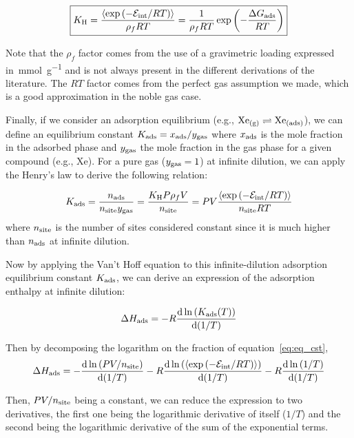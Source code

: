 \documentclass[main.tex]{subfiles}
\begin{document}
\begin{equation}\label{eq:henry}
    \boxed{
    K_{\text{H}} = \dfrac{\langle \exp\left(-\mathcal{E}_{\text{int}}/RT\right) \rangle}{\rho_f RT} = \dfrac{1}{\rho_f RT} \exp\left(-\dfrac{\Delta G_{\text{ads}}}{RT}\right)
    }
\end{equation}

Note that the $\rho_f$ factor comes from the use of a gravimetric loading expressed in~\si{\milli\mole\per\gram} and is not always present in the different derivations of the literature.\autocite{PoreBlazer} The $RT$ factor comes from the perfect gas assumption we made, which is a good approximation in the noble gas case. 

Finally, if we consider an adsorption equilibrium (e.g., $\text{Xe}_{\text{(g)}} \rightleftharpoons \text{Xe}_{\text{(ads)}}$), we can define an equilibrium constant $K_{\text{ads}} = x_{\text{ads}}/y_{\text{gas}}$ where $x_{\text{ads}}$ is the mole fraction in the adsorbed phase and $y_{\text{gas}}$ the mole fraction in the gas phase for a given compound (e.g., Xe). For a pure gas ($y_{\text{gas}}=1$) at infinite dilution, we can apply the Henry's law to derive the following relation:

\begin{equation}\label{eq:eq_cst}
  K_{\text{ads}} = \dfrac{n_{\text{ads}}}{n_{\text{site}}y_{\text{gas}}} = \dfrac{K_{\text{H}}P\rho_f V}{n_{\text{site}}} = PV \dfrac{\langle \exp\left(-\mathcal{E}_{\text{int}}/RT\right) \rangle}{n_{\text{site}}RT}
\end{equation}
where $n_{\text{site}}$ is the number of sites considered constant since it is much higher than $n_{\text{ads}}$ at infinite dilution.

Now by applying the Van't Hoff equation to this infinite-dilution adsorption equilibrium constant $K_{\text{ads}}$, we can derive an expression of the adsorption enthalpy at infinite dilution:

\begin{equation}
  \Delta H_{\text{ads}} = -R\dfrac{\mathop{}\mathopen{}\mathrm{d} \ln\left(K_{\text{ads}}(T)\right)}{\mathop{}\mathopen{}\mathrm{d} (1/T)}
\end{equation}

Then by decomposing the logarithm on the fraction of equation~\ref{eq:eq_cst}, 
\begin{equation}
  \Delta H_{\text{ads}} = -\dfrac{\mathop{}\mathopen{}\mathrm{d} \ln\left(PV/n_{\text{site}}\right)}{\mathop{}\mathopen{}\mathrm{d} (1/T)} - R\dfrac{\mathop{}\mathopen{}\mathrm{d} \ln\left(\langle \exp\left(-\mathcal{E}_{\text{int}}/RT\right) \rangle\right)}{\mathop{}\mathopen{}\mathrm{d} (1/T)} - R\dfrac{\mathop{}\mathopen{}\mathrm{d} \ln\left(1/T\right)}{\mathop{}\mathopen{}\mathrm{d} (1/T)}
\end{equation}

Then, $PV/n_{\text{site}}$ being a constant, we can reduce the expression to two derivatives, the first one being the logarithmic derivative of itself ($1/T$) and the second being the logarithmic derivative of the sum of the exponential terms. 
\end{document}
